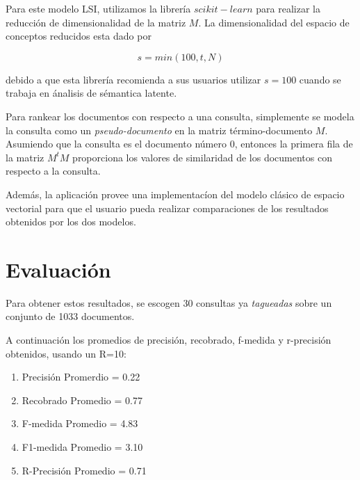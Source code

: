 \documentclass[a4paper, 10pt]{article}
\begin{document}
	Para este modelo LSI, utilizamos la librer\'ia $scikit-learn$ para realizar la reducci\'on de dimensionalidad
	de la matriz $M$. La dimensionalidad del espacio de conceptos reducidos esta dado por

	\begin{equation}
		s = min(100, t, N)	
	\end{equation}

	debido a que esta librer\'ia recomienda a sus usuarios utilizar $s = 100$ cuando se trabaja en \'analisis de s\'emantica latente.

	Para rankear los documentos con respecto a una consulta, simplemente se modela la consulta como un 
	\textit{pseudo-documento} en la matriz t\'ermino-documento $M$. Asumiendo que la consulta es el 
	documento n\'umero 0, entonces la primera fila de la matriz $M^tM$ proporciona los valores de similaridad de los documentos
	con respecto a la consulta.

	Adem\'as, la aplicaci\'on provee una implementac\'ion del modelo cl\'asico de espacio vectorial para que
	el usuario pueda realizar comparaciones de los resultados obtenidos por los dos modelos.

	\section{Evaluación}
	Para obtener estos resultados, se escogen 30 consultas ya \textit{tagueadas} sobre un conjunto de 1033 documentos.
	
	A continuación los promedios de precisión, recobrado, f-medida y r-precisión obtenidos, usando un R=10:
	
	\begin{enumerate}
       \item Precisión Promerdio = 0.22
        \item Recobrado Promedio = 0.77
        \item F-medida Promedio = 4.83
        \item F1-medida Promedio = 3.10
        \item R-Precisión Promedio = 0.71

    \end{enumerate}
\end{document}
